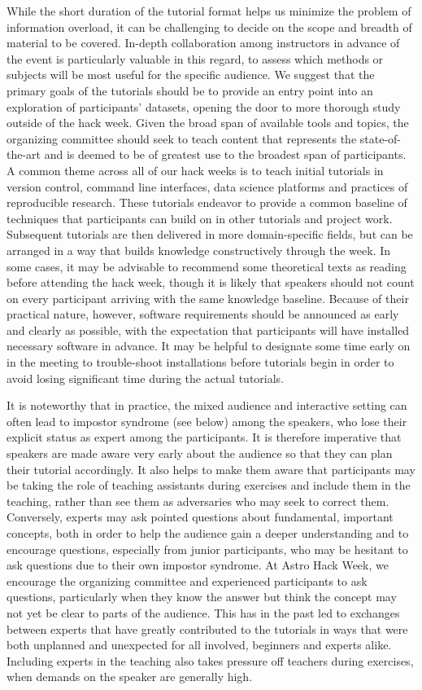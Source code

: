\documentclass{aastex62}
\begin{document}
While the short duration of the tutorial format helps us minimize the problem of information overload, it can be challenging to decide on the scope and breadth of material to be covered. In-depth collaboration among instructors in advance of the event is particularly valuable in this regard, to assess which methods or subjects will be most useful for the specific audience. We suggest that the primary goals of the tutorials should be to provide an entry point into an exploration of participants' datasets, opening the door to more thorough study outside of the hack week. Given the broad span of available tools and topics, the organizing committee should seek to teach content that represents the state-of-the-art and is deemed to be of greatest use to the broadest span of participants. A common theme across all of our hack weeks is to teach initial tutorials in version control, command line interfaces, data science platforms and practices of reproducible research. These tutorials endeavor to provide a common baseline of techniques that participants can build on in other tutorials and project work. Subsequent tutorials are then delivered in more domain-specific fields, but can be arranged in a way that builds knowledge constructively through the week. In some cases, it may be advisable to recommend some theoretical texts as reading before attending the hack week, though it is likely that speakers should not count on every participant arriving with the same knowledge baseline. Because of their practical nature, however, software requirements should be announced as early and clearly as possible, with the expectation that participants will have installed necessary software in advance. It may be helpful to designate some time early on in the meeting to trouble-shoot installations before tutorials begin in order to avoid losing significant time during the actual tutorials.

It is noteworthy that in practice, the mixed audience and interactive setting can often lead to impostor syndrome (see below) among the speakers, who lose their explicit status as expert among the participants. It is therefore imperative that speakers are made aware very early about the audience so that they can plan their tutorial accordingly. It also helps to make them aware that participants may be taking the role of teaching assistants during exercises and include them in the teaching, rather than see them as adversaries who may seek to correct them. Conversely, experts may ask pointed questions about fundamental, important concepts, both in order to help the audience gain a deeper understanding and to encourage questions, especially from junior participants, who may be hesitant to ask questions due to their own impostor syndrome. At Astro Hack Week, we encourage the organizing committee and experienced participants to ask questions, particularly when they know the answer but think the concept may not yet be clear to parts of the audience. This has in the past led to exchanges between experts that have greatly contributed to the tutorials in ways that were both unplanned and unexpected for all involved, beginners and experts alike. Including experts in the teaching also takes pressure off teachers during exercises, when demands on the speaker are generally high.
\end{document}
